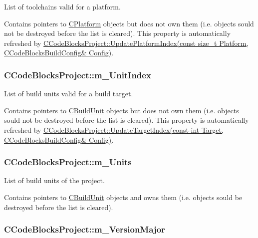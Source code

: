 List of toolchains valid for a platform. 

Contains pointers to \hyperlink{classCPlatform}{C\-Platform} objects but does not own them (i.\-e. objects sould not be destroyed before the list is cleared). This property is automatically refreshed by \hyperlink{classCCodeBlocksProject_a0456bbc2433f541b3409aa0722c9e19c}{C\-Code\-Blocks\-Project\-::\-Update\-Platform\-Index(const size\-\_\-t Platform, C\-Code\-Blocks\-Build\-Config\& Config)}. \hypertarget{classCCodeBlocksProject_a40ff58ecb0e82fcd2778053321323fbe}{
\subsubsection[{m\-\_\-\-Unit\-Index}]{\setlength{\rightskip}{0pt plus 5cm}C\-Code\-Blocks\-Project\-::m\-\_\-\-Unit\-Index\hspace{0.3cm}{\ttfamily [private]}}}\label{classCCodeBlocksProject_a40ff58ecb0e82fcd2778053321323fbe}


List of build units valid for a build target. 

Contains pointers to \hyperlink{classCBuildUnit}{C\-Build\-Unit} objects but does not own them (i.\-e. objects sould not be destroyed before the list is cleared). This property is automatically refreshed by \hyperlink{classCCodeBlocksProject_a78eda21e8436e55c5a36deb6519378eb}{C\-Code\-Blocks\-Project\-::\-Update\-Target\-Index(const int Target, C\-Code\-Blocks\-Build\-Config\& Config)}. \hypertarget{classCCodeBlocksProject_a7497caf84019495f7a31a259db36f74f}{
\subsubsection[{m\-\_\-\-Units}]{\setlength{\rightskip}{0pt plus 5cm}C\-Code\-Blocks\-Project\-::m\-\_\-\-Units\hspace{0.3cm}{\ttfamily [private]}}}\label{classCCodeBlocksProject_a7497caf84019495f7a31a259db36f74f}


List of build units of the project. 

Contains pointers to \hyperlink{classCBuildUnit}{C\-Build\-Unit} objects and owns them (i.\-e. objects sould be destroyed before the list is cleared). \hypertarget{classCCodeBlocksProject_ae7e3e490aaf03a97711cdbb02ec0a374}{
\subsubsection[{m\-\_\-\-Version\-Major}]{\setlength{\rightskip}{0pt plus 5cm}C\-Code\-Blocks\-Project\-::m\-\_\-\-Version\-Major\hspace{0.3cm}{\ttfamily [private]}}}\label{classCCodeBlocksProject_ae7e3e490aaf03a97711cdbb02ec0a374}


